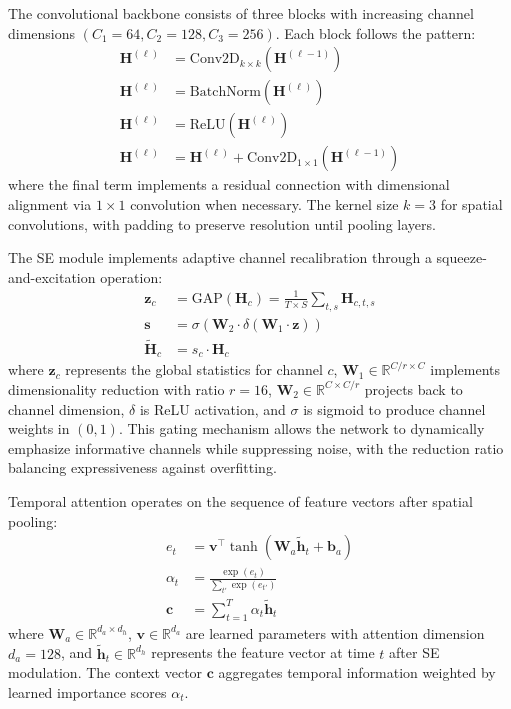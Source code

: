 \documentclass[journal]{IEEEtran}
\begin{document}
The convolutional backbone consists of three blocks with increasing channel dimensions $(C_1{=}64, C_2{=}128, C_3{=}256)$. Each block follows the pattern:
\begin{align}
\mathbf{H}^{(\ell)} &= \mathrm{Conv2D}_{k\times k}(\mathbf{H}^{(\ell-1)}) \\
\mathbf{H}^{(\ell)} &= \mathrm{BatchNorm}(\mathbf{H}^{(\ell)}) \\
\mathbf{H}^{(\ell)} &= \mathrm{ReLU}(\mathbf{H}^{(\ell)}) \\
\mathbf{H}^{(\ell)} &= \mathbf{H}^{(\ell)} + \mathrm{Conv2D}_{1\times 1}(\mathbf{H}^{(\ell-1)})
\end{align}
where the final term implements a residual connection with dimensional alignment via $1{\times}1$ convolution when necessary. The kernel size $k{=}3$ for spatial convolutions, with padding to preserve resolution until pooling layers.

The SE module implements adaptive channel recalibration through a squeeze-and-excitation operation:
\begin{align}
\mathbf{z}_c &= \mathrm{GAP}(\mathbf{H}_c) = \frac{1}{T \times S} \sum_{t,s} \mathbf{H}_{c,t,s} \\
\mathbf{s} &= \sigma(\mathbf{W}_2 \cdot \delta(\mathbf{W}_1 \cdot \mathbf{z})) \\
\tilde{\mathbf{H}}_c &= s_c \cdot \mathbf{H}_c
\end{align}
where $\mathbf{z}_c$ represents the global statistics for channel $c$, $\mathbf{W}_1 \in \mathbb{R}^{C/r \times C}$ implements dimensionality reduction with ratio $r{=}16$, $\mathbf{W}_2 \in \mathbb{R}^{C \times C/r}$ projects back to channel dimension, $\delta$ is ReLU activation, and $\sigma$ is sigmoid to produce channel weights in $(0,1)$. This gating mechanism allows the network to dynamically emphasize informative channels while suppressing noise, with the reduction ratio balancing expressiveness against overfitting.

Temporal attention operates on the sequence of feature vectors after spatial pooling:
\begin{align}
e_t &= \mathbf{v}^\top \tanh(\mathbf{W}_a \tilde{\mathbf{h}}_t + \mathbf{b}_a) \\
\alpha_t &= \frac{\exp(e_t)}{\sum_{t'} \exp(e_{t'})} \\
\mathbf{c} &= \sum_{t=1}^{T} \alpha_t \tilde{\mathbf{h}}_t
\end{align}
where $\mathbf{W}_a \in \mathbb{R}^{d_a \times d_h}$, $\mathbf{v} \in \mathbb{R}^{d_a}$ are learned parameters with attention dimension $d_a{=}128$, and $\tilde{\mathbf{h}}_t \in \mathbb{R}^{d_h}$ represents the feature vector at time $t$ after SE modulation. The context vector $\mathbf{c}$ aggregates temporal information weighted by learned importance scores $\alpha_t$.
\end{document}
